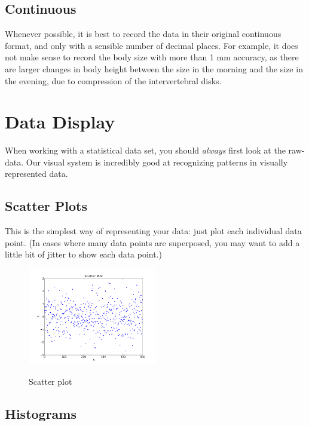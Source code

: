 \subsection{Continuous}
Whenever possible, it is best to record the data in their original continuous format, and only with a sensible number of decimal places. For example, it does not make sense to record the body size with more than 1 mm accuracy, as there are larger changes in body height between the size in the morning and the size in the evening, due to compression of the intervertebral disks.

\section{Data Display}

When working with a statistical data set, you should \emph{always} first look at the raw-data. Our visual system is incredibly good at recognizing patterns in visually represented data.

\subsection{Scatter Plots}

This is the simplest way of representing your data: just plot each individual data point. (In cases where many data points are superposed, you may want to add a little bit of jitter to show each data point.)

\begin{figure}[h]
  \centering
  \includegraphics[width=0.5\textwidth]{../Images/scatterPlot.png}\\
  \caption{Scatter plot}
\end{figure}

\subsection{Histograms}

